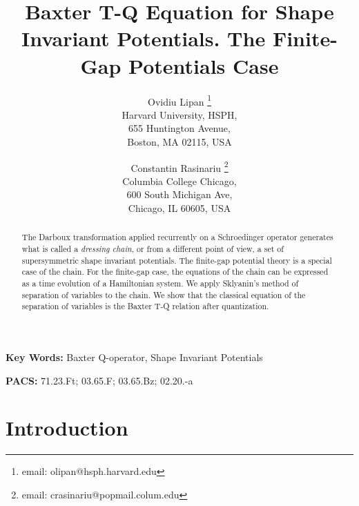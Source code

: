 \documentclass[a4paper,11pt]{article}
\begin{document}
\title{Baxter T-Q Equation for Shape Invariant Potentials.
The Finite-Gap Potentials Case}
\author{Ovidiu Lipan \thanks{email: olipan@hsph.harvard.edu} \\
     Harvard University, HSPH,\\
     655 Huntington Avenue,\\
     Boston, MA 02115, USA \\
    \and
    Constantin Rasinariu \thanks{email: crasinariu@popmail.colum.edu}\\
    Columbia College Chicago,\\
    600 South Michigan Ave,\\
    Chicago, IL 60605, USA}
\maketitle
\begin{abstract}
The Darboux transformation applied recurrently on a Schroedinger operator
generates what is called a {\em dressing chain}, or from a different point
of view, a set of supersymmetric shape invariant potentials. The finite-gap
potential theory is a special case of the chain. For the finite-gap case,
the equations of the chain can be expressed as a time evolution of a
Hamiltonian system. We apply Sklyanin's method of separation of variables to
the chain. We show that the classical equation of the separation of
variables is the Baxter T-Q relation after quantization.
\end{abstract}

{\bf Key Words:} Baxter Q-operator, Shape Invariant Potentials

{\bf PACS:} 71.23.Ft; 03.65.F; 03.65.Bz; 02.20.-a

\parskip 5pt
%
\section{Introduction}
\end{document}
